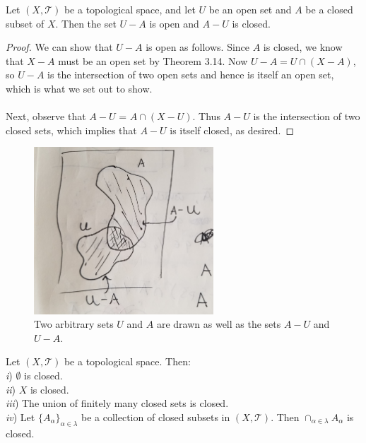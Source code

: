 \documentclass[letterpaper,12pt,twoside]{maths}
\begin{document}
\begin{problem}[Theorem 3.15] Let $(X, \mathscr{T})$ be a topological
    space, and let $U$ be an open set and $A$ be a closed subset of
    $X$. Then the set $U - A$ is open and $A - U$ is closed.
\end{problem}

\begin{proof}
    We can show that $U - A$ is open as follows. Since $A$ is closed,
    we know that $X - A$ must be an open set by Theorem 3.14. Now $U - A = U \cap (X -
    A)$, so $U - A$ is the intersection of two open sets and hence is
    itself an open set, which is what we set out to show.\\
    \\
    Next, observe that $A - U$ = $A \cap (X - U)$. Thus $A - U$ 
    is the intersection of two closed sets, which implies that $A - U$
    is itself closed, as desired.
\end{proof}
\begin{figure}[h!]
    \centering
    \includegraphics[width=0.6\textwidth]{sketch_theorem_3_15_2.jpg}
    \caption{Two arbitrary sets $U$ and $A$ are drawn as well as the
    sets $A-U$ and $U-A$.}
\end{figure}

\begin{problem}[Theorem 3.16] Let $(X, \mathscr{T})$ be a topological
    space. Then:\\
    \textit{i}) $\emptyset$ is closed.\\
    \textit{ii}) $X$ is closed.\\
    \textit{iii}) The union of finitely many closed sets is closed.\\
    \textit{iv}) Let $\{A_{\alpha}\}_{\alpha \in \lambda}$ be a
    collection of closed subsets in $(X, \mathscr{T})$. Then
    $\cap_{\alpha \in \lambda} A_\alpha$ is closed.
\end{problem}
\end{document}
